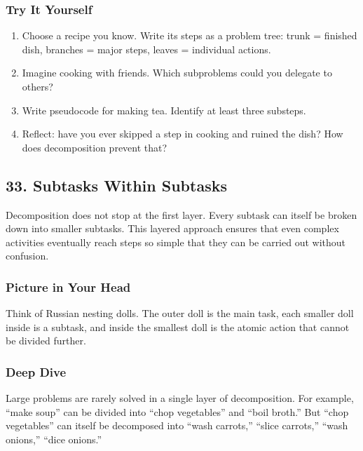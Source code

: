 \documentclass[
  letterpaper,
  DIV=11,
  numbers=noendperiod]{scrreprt}
\providecommand{\tightlist}{%
  \setlength{\itemsep}{0pt}\setlength{\parskip}{0pt}}
\begin{document}
\subsubsection{Try It Yourself}\label{try-it-yourself-31}

\begin{enumerate}
\def\labelenumi{\arabic{enumi}.}
\tightlist
\item
  Choose a recipe you know. Write its steps as a problem tree: trunk =
  finished dish, branches = major steps, leaves = individual actions.
\item
  Imagine cooking with friends. Which subproblems could you delegate to
  others?
\item
  Write pseudocode for making tea. Identify at least three substeps.
\item
  Reflect: have you ever skipped a step in cooking and ruined the dish?
  How does decomposition prevent that?
\end{enumerate}

\subsection{33. Subtasks Within
Subtasks}\label{subtasks-within-subtasks}

Decomposition does not stop at the first layer. Every subtask can itself
be broken down into smaller subtasks. This layered approach ensures that
even complex activities eventually reach steps so simple that they can
be carried out without confusion.

\subsubsection{Picture in Your Head}\label{picture-in-your-head-32}

Think of Russian nesting dolls. The outer doll is the main task, each
smaller doll inside is a subtask, and inside the smallest doll is the
atomic action that cannot be divided further.

\subsubsection{Deep Dive}\label{deep-dive-2}

Large problems are rarely solved in a single layer of decomposition. For
example, ``make soup'' can be divided into ``chop vegetables'' and
``boil broth.'' But ``chop vegetables'' can itself be decomposed into
``wash carrots,'' ``slice carrots,'' ``wash onions,'' ``dice onions.''
\end{document}
